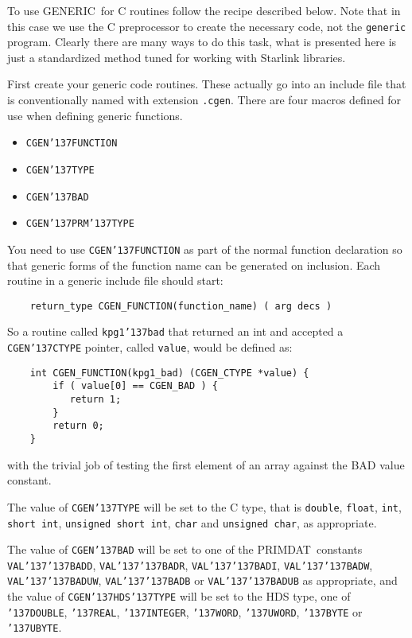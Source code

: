 \documentclass[twoside,11pt]{article}
\renewcommand{\_}{{\tt\char'137}}     %
\newcommand{\GENERIC}{{\footnotesize GENERIC}\normalsize}
\newcommand{\PRIMDAT}{{\footnotesize PRIMDAT}\normalsize}
\begin{document}
To use \GENERIC\ for C routines follow the recipe described below. Note that
in this case we use the C preprocessor to create the necessary code, not the
{\tt generic} program. Clearly there are many ways to do this task, what is
presented here is just a standardized method tuned for working with Starlink
libraries.

First create your generic code routines. These actually go into an include
file that is conventionally named with extension {\tt .cgen}. There are four
macros defined for use when defining generic functions.

\begin{itemize}
\item {\tt CGEN\_FUNCTION}
\item {\tt CGEN\_TYPE}
\item {\tt CGEN\_BAD}
\item {\tt CGEN\_PRM\_TYPE}
\end{itemize}

You need to use {\tt CGEN\_FUNCTION} as part of the normal function
declaration so that generic forms of the function name can be generated on
inclusion. Each routine in a generic include file should start:

\begin{verbatim}
    return_type CGEN_FUNCTION(function_name) ( arg decs )
\end{verbatim}

So a routine called {\tt kpg1\_bad} that returned an int and accepted a
{\tt CGEN\_CTYPE} pointer, called {\tt value}, would be defined as:

\begin{verbatim}
    int CGEN_FUNCTION(kpg1_bad) (CGEN_CTYPE *value) {
        if ( value[0] == CGEN_BAD ) {
           return 1;
        }
        return 0;
    }
\end{verbatim}

with the trivial job of testing the first element of an array against the BAD
value constant.

The value of {\tt CGEN\_TYPE} will be set to the C type, that is
{\tt double}, {\tt float}, {\tt int}, {\tt short int},
{\tt unsigned short int}, {\tt char} and {\tt unsigned char}, as
appropriate.

The value of {\tt CGEN\_BAD} will be set to one of the \PRIMDAT\ constants
{\tt VAL\_\_BADD},
{\tt VAL\_\_BADR},
{\tt VAL\_\_BADI},
{\tt VAL\_\_BADW},
{\tt VAL\_\_BADUW},
{\tt VAL\_\_BADB} or
{\tt VAL\_\_BADUB}
as appropriate, and the value of {\tt CGEN\_HDS\_TYPE} will be set to the HDS
type, one of
{\tt \_DOUBLE},
{\tt \_REAL},
{\tt \_INTEGER},
{\tt \_WORD},
{\tt \_UWORD},
{\tt \_BYTE} or
{\tt \_UBYTE}.
\end{document}
